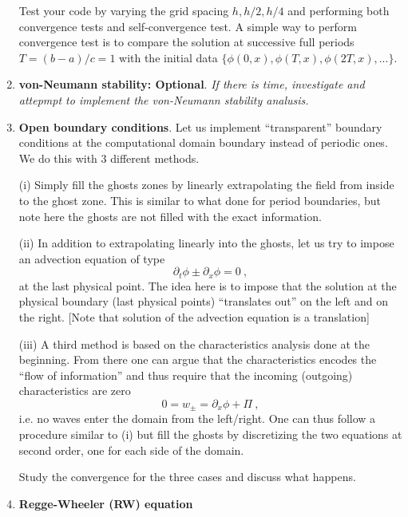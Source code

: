 \documentclass[11pt,a4paper,headinclude=true,DIV=14,BCOR=8mm,chapterprefix,listof=totoc,twoside,openright,abstracton]{scrbook}
\begin{document}
\begin{enumerate}
  Test your code by varying the grid
  spacing $h,h/2,h/4$ and performing both convergence tests and self-convergence
  test. A simple way to perform convergence test is to compare
  the solution at successive full periods $T=(b-a)/c=1$ with the initial
  data $\{\phi(0,x),\phi(T,x),\phi(2T,x),...\}$.

\item \textbf{von-Neumann stability: Optional}. \textit{If there is time, investigate and attepmpt to implement the von-Neumann stability analusis.}

\item \textbf{Open boundary conditions}. Let us implement ``transparent''
  boundary conditions at the computational domain boundary instead of
  periodic ones. We do this with 3 different methods.

  (i) Simply fill the ghosts zones by linearly extrapolating the field
  from inside to the ghost zone. This is similar to what done for
  period boundaries, but note here the ghosts are not filled with the exact 
  information.
  
  (ii) In addition to extrapolating linearly into the ghosts, let us
  try to impose an advection equation of type 
  \begin{equation}
    \partial_{t} \phi \pm \partial_{x} \phi = 0 \ ,
  \end{equation}
  at the last physical point. The idea here is to impose that the
  solution at the physical boundary (last physical points)
  ``translates out'' on the left and on the right. [Note that solution
    of the advection equation is a translation]
  
  (iii) A third method is based on the characteristics analysis done
  at the beginning. From there one can argue that the
  characteristics encodes the ``flow of information'' and thus require
  that the incoming (outgoing) characteristics are zero 
  \begin{equation}
    0 = w_\pm = \partial_x \phi + \Pi \ , 
  \end{equation}
  i.e. no waves enter the domain from the left/right.
  One can thus follow a procedure similar to (i) but fill the ghosts
  by discretizing the two equations at second order, one for each side of the domain. 

  Study the convergence for the three cases and discuss what happens.


\item {\textbf{Regge-Wheeler (RW) equation}} 


\end{enumerate}
\end{document}
